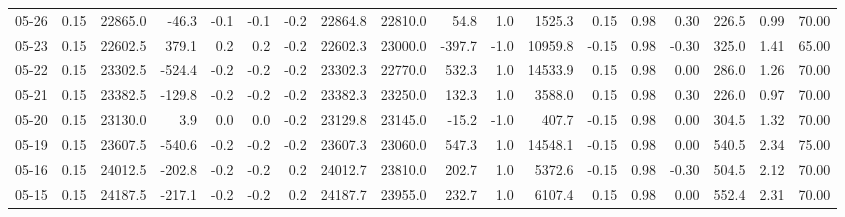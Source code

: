 \begin{threeparttable}
{\begin{tabular}{lrrrrrrrrrrrrrrrrr}
  05-26 &     0.15 & 22865.0 &             -46.3 &              -0.1 &               -0.1 &               -0.2 & 22864.8 & 22810.0 &       54.8 &                      1.0 &              1525.3 &       0.15 &      0.98 &           0.30 &            226.5 &            0.99 &                  70.00 \\
  05-23 &     0.15 & 22602.5 &             379.1 &               0.2 &                0.2 &               -0.2 & 22602.3 & 23000.0 &     -397.7 &                     -1.0 &             10959.8 &      -0.15 &      0.98 &          -0.30 &            325.0 &            1.41 &                  65.00 \\
  05-22 &     0.15 & 23302.5 &            -524.4 &              -0.2 &               -0.2 &               -0.2 & 23302.3 & 22770.0 &      532.3 &                      1.0 &             14533.9 &       0.15 &      0.98 &           0.00 &            286.0 &            1.26 &                  70.00 \\
  05-21 &     0.15 & 23382.5 &            -129.8 &              -0.2 &               -0.2 &               -0.2 & 23382.3 & 23250.0 &      132.3 &                      1.0 &              3588.0 &       0.15 &      0.98 &           0.30 &            226.0 &            0.97 &                  70.00 \\
  05-20 &     0.15 & 23130.0 &               3.9 &               0.0 &                0.0 &               -0.2 & 23129.8 & 23145.0 &      -15.2 &                     -1.0 &               407.7 &      -0.15 &      0.98 &           0.00 &            304.5 &            1.32 &                  70.00 \\
  05-19 &     0.15 & 23607.5 &            -540.6 &              -0.2 &               -0.2 &               -0.2 & 23607.3 & 23060.0 &      547.3 &                      1.0 &             14548.1 &      -0.15 &      0.98 &           0.00 &            540.5 &            2.34 &                  75.00 \\
  05-16 &     0.15 & 24012.5 &            -202.8 &              -0.2 &               -0.2 &                0.2 & 24012.7 & 23810.0 &      202.7 &                      1.0 &              5372.6 &      -0.15 &      0.98 &          -0.30 &            504.5 &            2.12 &                  70.00 \\
  05-15 &     0.15 & 24187.5 &            -217.1 &              -0.2 &               -0.2 &                0.2 & 24187.7 & 23955.0 &      232.7 &                      1.0 &              6107.4 &       0.15 &      0.98 &           0.00 &            552.4 &            2.31 &                  70.00 \\

\end{tabular}}
\end{threeparttable}
